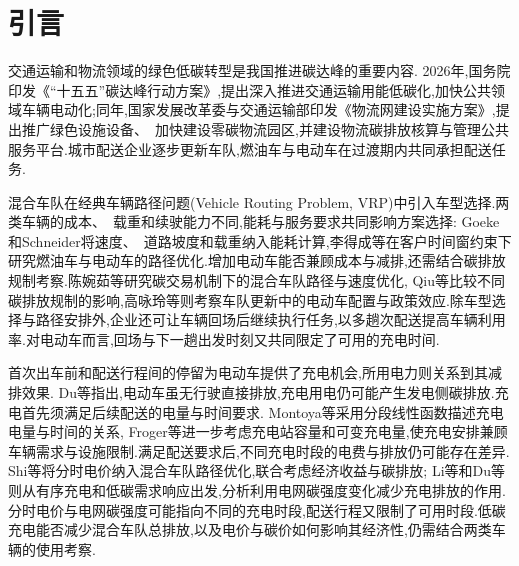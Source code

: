 \documentclass{setp-new}
\begin{document}
\maketitle

\section{引言}

交通运输和物流领域的绿色低碳转型是我国推进碳达峰的重要内容. 2026年,国务院印发《``十五五''碳达峰行动方案》,提出深入推进交通运输用能低碳化,加快公共领域车辆电动化\cite{ref:tdf1555};同年,国家发展改革委与交通运输部印发《物流网建设实施方案》,提出推广绿色设施设备、~加快建设零碳物流园区,并建设物流碳排放核算与管理公共服务平台\cite{ref:wlw2026}.城市配送企业逐步更新车队,燃油车与电动车在过渡期内共同承担配送任务\cite{ref:gao2025}.

混合车队在经典车辆路径问题(Vehicle Routing Problem, VRP)\cite{ref:dantzig}中引入车型选择.两类车辆的成本、~载重和续驶能力不同,能耗与服务要求共同影响方案选择: Goeke和Schneider\cite{ref:27}将速度、~道路坡度和载重纳入能耗计算,李得成等\cite{ref:6}在客户时间窗约束下研究燃油车与电动车的路径优化.增加电动车能否兼顾成本与减排,还需结合碳排放规制考察.陈婉茹等\cite{ref:23}研究碳交易机制下的混合车队路径与速度优化, Qiu等\cite{ref:qiu2024}比较不同碳排放规制的影响,高咏玲等\cite{ref:gao2025}则考察车队更新中的电动车配置与政策效应.除车型选择与路径安排外,企业还可让车辆回场后继续执行任务,以多趟次配送提高车辆利用率\cite{ref:sahin}.对电动车而言,回场与下一趟出发时刻又共同限定了可用的充电时间.

首次出车前和配送行程间的停留为电动车提供了充电机会,所用电力则关系到其减排效果. Du等\cite{ref:du2025}指出,电动车虽无行驶直接排放,充电用电仍可能产生发电侧碳排放.充电首先须满足后续配送的电量与时间要求. Montoya等\cite{ref:montoya}采用分段线性函数描述充电电量与时间的关系, Froger等\cite{ref:12}进一步考虑充电站容量和可变充电量,使充电安排兼顾车辆需求与设施限制.满足配送要求后,不同充电时段的电费与排放仍可能存在差异. Shi等\cite{ref:shi2025}将分时电价纳入混合车队路径优化,联合考虑经济收益与碳排放; Li等\cite{ref:52}和Du等\cite{ref:du2025}则从有序充电和低碳需求响应出发,分析利用电网碳强度变化减少充电排放的作用.分时电价与电网碳强度可能指向不同的充电时段,配送行程又限制了可用时段.低碳充电能否减少混合车队总排放,以及电价与碳价如何影响其经济性,仍需结合两类车辆的使用考察.
\end{document}
